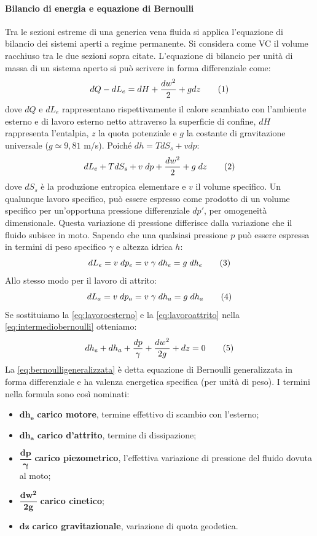 \paragraph{Bilancio di energia e equazione di Bernoulli}
Tra le sezioni estreme di una generica vena fluida si applica l'equazione di bilancio dei sistemi aperti a regime permanente. Si considera come VC il volume racchiuso tra le due sezioni sopra citate. L'equazione di bilancio per unità di massa di un sistema aperto si può scrivere in forma differenziale come:
\[dQ-dL_e=dH+\frac{dw^2}{2}+gdz\addtag\]
dove $dQ$ e $dL_e$ rappresentano rispettivamente il calore scambiato con l'ambiente esterno e di lavoro esterno netto attraverso la superficie di confine, $dH$ rappresenta l'entalpia, $z$ la quota potenziale e \(g\) la costante di gravitazione universale (\(g \simeq 9,81\) m/s). Poiché $dh=TdS_s+vdp$:
\[dL_e+TdS_s+v \; dp+\frac{dw^2}{2}+g \; dz\label{eq:intermediobernoulli}\addtag\]
dove $dS_s$ è la produzione entropica elementare e $v$ il volume specifico. Un qualunque lavoro specifico, può essere espresso come prodotto di un volume specifico per un'opportuna pressione differenziale $dp'$, per omogeneità dimensionale. Questa variazione di pressione differisce dalla variazione che il fluido subisce in moto. Sapendo che una qualsiasi pressione $p$ può essere espressa in termini di peso specifico $\gamma$ e altezza idrica $h$:
\[dL_e=v\;dp_e=v\;\gamma\;dh_e=g\;dh_e\addtag\label{eq:lavoroesterno}\]
Allo stesso modo per il lavoro di attrito:
\[dL_a=v\;dp_a=v\;\gamma\;dh_a=g\;dh_a\addtag\label{eq:lavoroattrito}\]
Se sostituiamo la \eqref{eq:lavoroesterno} e la \eqref{eq:lavoroattrito} nella \eqref{eq:intermediobernoulli} otteniamo:
\[dh_e+dh_a+\frac{dp}{\gamma}+\frac{dw^2}{2g}+dz=0\label{eq:bernoulligeneralizzata}\addtag\]
La \eqref{eq:bernoulligeneralizzata} è detta equazione di Bernoulli generalizzata in forma differenziale e ha valenza energetica specifica (per unità di peso). I termini nella formula sono così nominati:
\begin{itemize}
    \item \(\mathbf{dh_e}\) \textbf{carico motore}, termine effettivo di scambio con l'esterno;
    \item \(\mathbf{dh_a}\) \textbf{carico d'attrito}, termine di dissipazione;
    \item \(\mathbf{\dfrac{dp}{\gamma}}\) \textbf{carico piezometrico}, l'effettiva variazione di pressione del fluido dovuta al moto;
    \item \(\mathbf{\dfrac{dw^2}{2g}}\) \textbf{carico cinetico};
    \item \(\mathbf{dz}\) \textbf{carico gravitazionale}, variazione di quota geodetica. 
\end{itemize}
